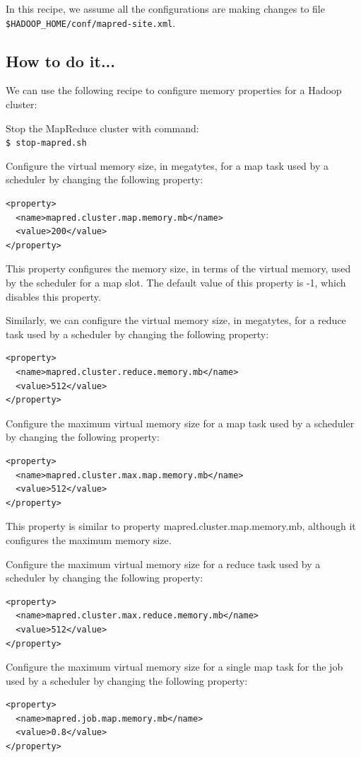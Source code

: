 In this recipe, we assume all the configurations are making changes to file \verb|$HADOOP_HOME/conf/mapred-site.xml|.
\subsection*{How to do it...}
We can use the following recipe to configure memory properties for a Hadoop cluster:

Stop the MapReduce cluster with command: \\
\verb|$ stop-mapred.sh|

Configure the virtual memory size, in megatytes, for a map task used by a scheduler by changing the following property:
\lstset{style=bashstyle}
\begin{lstlisting}
<property>
  <name>mapred.cluster.map.memory.mb</name>
  <value>200</value>
</property>
\end{lstlisting}

This property configures the memory size, in terms of the virtual memory, used by the scheduler for a map slot. The default value of this property is -1, which disables this property.


Similarly, we can configure the virtual memory size, in megatytes, for a reduce task used by a scheduler by changing the following property:
\lstset{style=bashstyle}
\begin{lstlisting}
<property>
  <name>mapred.cluster.reduce.memory.mb</name>
  <value>512</value>
</property>
\end{lstlisting}

Configure the maximum virtual memory size for a map task used by a scheduler by changing the following property:
\lstset{style=bashstyle}
\begin{lstlisting}
<property>
  <name>mapred.cluster.max.map.memory.mb</name>
  <value>512</value>
</property>
\end{lstlisting}

This property is similar to property  mapred.cluster.map.memory.mb, although it configures the maximum memory size.

Configure the maximum virtual memory size for a reduce task used by a scheduler by changing the following property:
\lstset{style=bashstyle}
\begin{lstlisting}
<property>
  <name>mapred.cluster.max.reduce.memory.mb</name>
  <value>512</value>
</property>
\end{lstlisting}

Configure the maximum virtual memory size for a single map task for the job used by a scheduler by changing the following property:
\lstset{style=bashstyle}
\begin{lstlisting}
<property>
  <name>mapred.job.map.memory.mb</name>
  <value>0.8</value>
</property>
\end{lstlisting}

